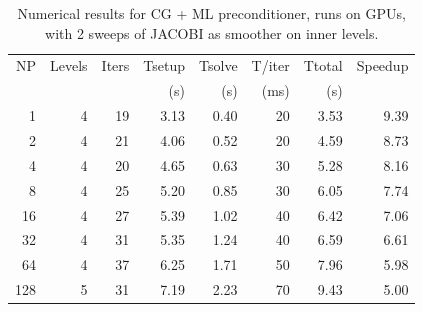\begin{table}[h!]
\centering
\caption{Numerical results for CG + ML preconditioner, runs on GPUs, with 2 sweeps of JACOBI as smoother on inner levels.}
\label{gpu-jac}
\begin{tabular}{rrrrrrrr}
NP  & Levels & Iters & Tsetup & Tsolve & T/iter & Ttotal & Speedup\\
    &        &       & (s)    & (s)    & (ms)   & (s)   &  \\
\hline
1   & 4       & 19  & 3.13  & 0.40 & 20   & 3.53 & 9.39  \\
2   & 4       & 21  & 4.06  & 0.52 & 20   & 4.59 & 8.73  \\
4   & 4       & 20  & 4.65  & 0.63 & 30   & 5.28 & 8.16  \\
8   & 4       & 25  & 5.20  & 0.85 & 30   & 6.05 & 7.74  \\
16  & 4       & 27  & 5.39  & 1.02 & 40   & 6.42 & 7.06  \\
32  & 4       & 31  & 5.35  & 1.24 & 40   & 6.59 & 6.61  \\
64  & 4       & 37  & 6.25  & 1.71 & 50   & 7.96 & 5.98  \\ 
128 & 5       & 31  & 7.19  & 2.23 & 70   & 9.43 & 5.00  \\
\hline
\end{tabular}
\end{table}

\else

